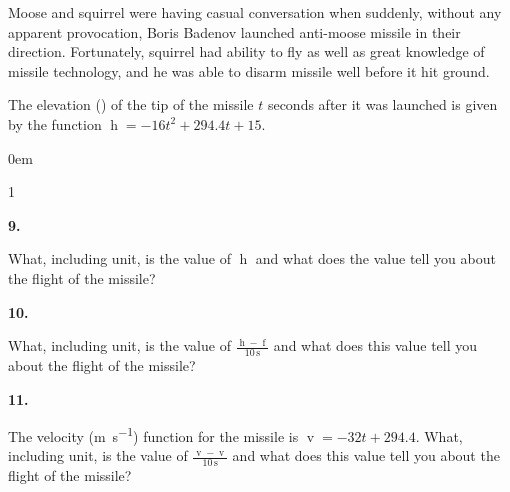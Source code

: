 \documentclass[12pt,]{book}
\theoremstyle{plain}
\theoremstyle{definition}
\numberwithin{equation}{section}
\newenvironment{exercisegroup}%
{\medskip\noindent}%
{\par\bigskip}%
\newlength{\exercisegroupindent}%
\newlength{\exercisegroupitemwidth}%
\newenvironment{exercisegrouplist}%
{\vspace{-\partopsep}%
\begin{adjustwidth}{\exercisegroupindent}{0em}}%
{\end{adjustwidth}%
\vspace{-\partopsep}%
\vspace{\baselineskip}}%
\newenvironment{exercisegroupbycol}[1]%
{\begin{exercisegrouplist}%
\vspace{-\multicolsep}%
\begin{multicols}{#1}%
\setlength{\parindent}{0em}%
\setlength{\exercisegroupitemwidth}{\linewidth}}%
{\end{multicols}%
\vspace{-\multicolsep}%
\end{exercisegrouplist}}%
\newenvironment{exercisegroupitem}[1]%
{\begin{minipage}[t]{\exercisegroupitemwidth}
\vspace{0pt}%
{\bfseries#1}%
\rule{0pt}{\baselineskip}}{\strut%
\end{minipage}%
\hspace{\columnsep}}%
\providecommand\phantomsection{}
\newcommand{\fe}[2]{\mathop{{#1}{\left(#2\right)}}}
\begin{document}
\begin{exercisegroup}%
Moose and squirrel were having casual conversation when suddenly, without any apparent provocation, Boris Badenov launched anti-moose missile in their direction. Fortunately, squirrel had ability to fly as well as great knowledge of missile technology, and he was able to disarm missile well before it hit ground.%
\par
The elevation (\si{\foot}) of the tip of the missile \(t\) seconds after it was launched is given by the function \(\fe{h}{t}=-16t^2+294.4t+15\).%
\par
\begin{exercisegroupbycol}{1}%
\begin{exercisegroupitem}{9. }\phantomsection\hypertarget{exercise-17}{\null}
What, including unit, is the value of \(\fe{h}{12}\) and what does the value tell you about the flight of the missile?%
\end{exercisegroupitem}%
\par%
\begin{exercisegroupitem}{10. }\phantomsection\hypertarget{exercise-18}{\null}
What, including unit, is the value of \(\frac{\fe{h}{10\,\text{s}}-\fe{f}{0\,\text{s}}}{10\,\text{s}}\) and what does this value tell you about the flight of the missile?%
\end{exercisegroupitem}%
\par%
\begin{exercisegroupitem}{11. }\phantomsection\hypertarget{exercise-19}{\null}
The velocity (\si{\meter\per\second}) function for the missile is \(\fe{v}{t}=-32t+294.4\). What, including unit, is the value of \(\frac{\fe{v}{10\,\text{s}}-\fe{v}{0\,\text{s}}}{10\,\text{s}}\) and what does this value tell you about the flight of the missile?%
\end{exercisegroupitem}%
\par%
\end{exercisegroupbycol}%
\end{exercisegroup}%
\end{document}

